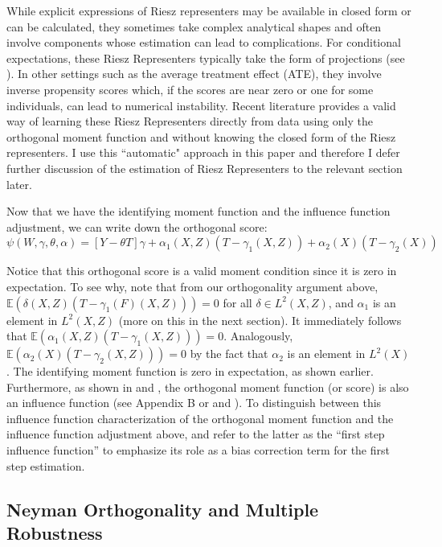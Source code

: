 While explicit expressions of Riesz representers may be available in closed form or can be calculated, they sometimes take complex analytical shapes and often involve components whose estimation can lead to complications. For conditional expectations, these Riesz Representers typically take the form of projections (see \citet{newey1994asymptotic}). In other settings such as the average treatment effect (ATE), they involve inverse propensity scores which, if the scores are near zero or one for some individuals, can lead to numerical instability. Recent literature provides a valid way of learning these Riesz Representers directly from data using only the orthogonal moment function and without knowing the closed form of the Riesz representers. I use this ``automatic" approach in this paper and therefore I defer further discussion of the estimation of Riesz Representers to the relevant section later. 

Now that we have the identifying moment function and the influence function adjustment, we can write down the orthogonal score:
\[\psi(W, \gamma, \theta, \alpha)=[Y-\theta T]\gamma+\alpha_1(X,Z)(T-\gamma_1(X,Z))+\alpha_2(X)(T-\gamma_2(X))\]

Notice that this orthogonal score is a valid moment condition since it is zero in expectation. To see why, note that from our orthogonality argument above, $\mathbb{E}(\delta(X,Z)(T - \gamma_1(F)(X,Z)) ) = 0$ for all $\delta \in L^2(X,Z)$, and $\alpha_1$ is an element in $L^2(X,Z)$ (more on this in the next section). It immediately follows that $\mathbb{E}(\alpha_1(X,Z)(T-\gamma_1(X,Z)))=0$. Analogously, $\mathbb{E}(\alpha_2(X)(T-\gamma_2(X,Z)))=0$ by the fact that $\alpha_2$ is an element in $L^2(X)$. The identifying moment function is zero in expectation, as shown earlier. Furthermore, as shown in \citet{ichimura2022influence} and \citet{chernozhukov2022locally}, the orthogonal moment function (or score) is also an influence function (see Appendix B or \citet{ichimura2022influence} and \citet{chernozhukov2022locally}). To distinguish between this influence function characterization of the orthogonal moment function and the influence function adjustment above, \citet{ichimura2022influence} and \citet{chernozhukov2022locally} refer to the latter as the \enquote{first step influence function} to emphasize its role as a bias correction term for the first step estimation.

\subsection{Neyman Orthogonality and Multiple Robustness}

